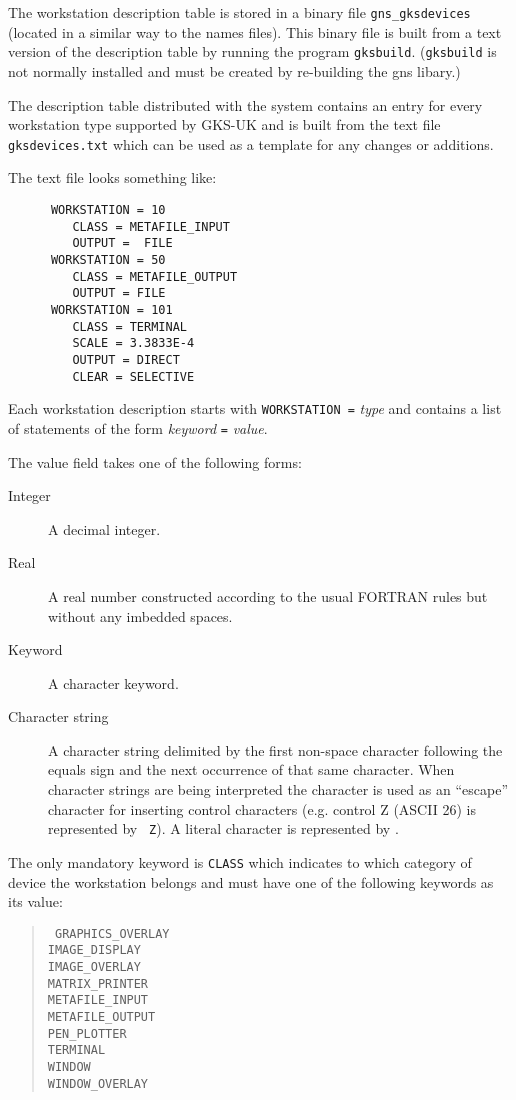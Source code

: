 The workstation description table is stored in a binary file 
{\tt gns\_gksdevices} (located in a similar way to the names files).
This binary file is built from a text version of the
description table by running the program {\tt gksbuild}. ({\tt gksbuild}
is not normally installed and must be created by re-building the
gns libary.)

The description table distributed with the system contains an entry for every
workstation type supported by GKS-UK and is built from the text file {\tt
gksdevices.txt} which can be used as a template for any changes or
additions.

The text file looks something like:

\begin{verbatim}
      WORKSTATION = 10
         CLASS = METAFILE_INPUT
         OUTPUT =  FILE
      WORKSTATION = 50
         CLASS = METAFILE_OUTPUT
         OUTPUT = FILE
      WORKSTATION = 101
         CLASS = TERMINAL
         SCALE = 3.3833E-4
         OUTPUT = DIRECT
         CLEAR = SELECTIVE
\end{verbatim}

Each workstation description starts with {\tt WORKSTATION =} {\em type} and
contains a list of statements of the form {\em keyword} {\tt =} {\em value}.

The value field takes one of the following forms:
\begin{description}
\item[Integer] A decimal integer.
\item[Real] A real number constructed according to the usual FORTRAN rules but
without any imbedded spaces.
\item[Keyword] A character keyword.
\item[Character string] A character string delimited by the first non-space 
character following the equals sign and the next occurrence of that same 
character.
When character strings are being interpreted the {\tt{}} character is used
as an ``escape'' character for inserting control characters (e.g. control Z
(ASCII 26) is represented by {\tt{} Z}). A literal {\tt{}} character
is represented by {\tt{}}.
\end{description}

The only mandatory keyword is {\tt CLASS} which indicates to which category of
device the workstation belongs and must have one of the following
keywords as its value:

\begin{quote}{\tt
GRAPHICS\_OVERLAY\\
IMAGE\_DISPLAY\\
IMAGE\_OVERLAY \\
MATRIX\_PRINTER\\
METAFILE\_INPUT\\
METAFILE\_OUTPUT\\
PEN\_PLOTTER\\
TERMINAL\\
WINDOW\\
WINDOW\_OVERLAY}
\end{quote}

